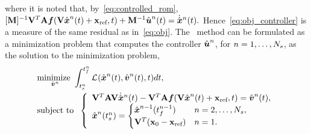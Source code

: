 where it is noted that, by~\eqref{eq:controlled_rom}, $
[\massArgnt{n}]^{-1}\basisspace^T \stweightingMatArg{n} \velocity(\basisspace \genstateArg{n}{t} + \stateIntercept ,t) +
\mass^{-1}\controllerArg{n}{t}  = \genstateDotArg{n}{t}.$ 
Hence~\eqref{eq:obj_controller} is a measure of the same residual as in~\eqref{eq:obj}.  The \methodAcronym\ method can be formulated as a minimization problem 
that computes the controller $\controllerArgnt{n}$, for $n=1,\ldots,\nslabs$, as the solution to the minimization problem, 
\begin{equation}\label{eq:tclspg_oc1a} 
\begin{split}
&\underset{\controllerDumArgnt{n} }{\text{minimize } } 
\int_{\timeStartArg{n}}^{\timeEndArg{n}}
\objectiveControlArg{}(\genstateArg{n}{t},\controllerDumArg{n}{t},t)dt, 
 \\
&\text{subject to } \;  \left\{\begin{array}{l} 
 \basisspace^T \stweightingMatArgt{n}{t}
\basisspace  \genstateDotArg{n}{t}  - \basisspace^T
\stweightingMatArgt{n}{t} \velocity(\basisspace \genstateArg{n}{t} +
\stateIntercept,t) =\controllerDumArg{n}{t}, \\
 \genstateArg{n}{\timeStartArg{n}} =
\begin{cases} \genstate^{n-1}(\timeEndArg{n-1} ) & n = 2,\ldots,\nslabs,
 \\ \basisspace^T(\stateFOMIC - \stateIntercept) & n=1. \end{cases} \end{array} \right.
\end{split}
\end{equation}
